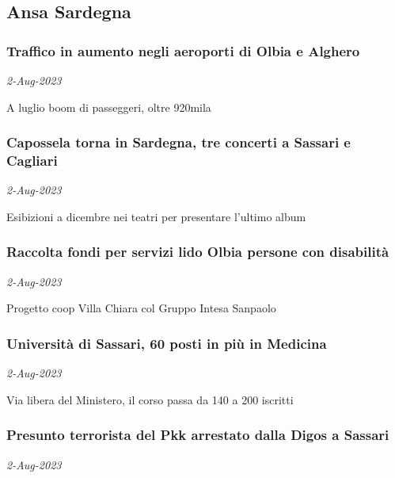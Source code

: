 \subsection{Ansa Sardegna \href{https://www.ansa.it/sardegna}{}}
\subsubsection{Traffico in aumento negli aeroporti di Olbia e Alghero \href{https://www.ansa.it/sardegna/notizie/2023/08/02/traffico-in-aumento-negli-aeroporti-di-olbia-e-alghero_aed7bae8-678e-4b3b-85d7-598a21b95419.html}{}}
\textit{2-Aug-2023}

A luglio boom di passeggeri, oltre 920mila
\subsubsection{Capossela torna in Sardegna, tre concerti a Sassari e Cagliari \href{https://www.ansa.it/sardegna/notizie/2023/08/02/capossela-torna-in-sardegna-tre-concerti-a-sassari-e-cagliari_9192115a-9063-4fb8-b7ef-a3efb7cfa1d4.html}{}}
\textit{2-Aug-2023}

Esibizioni a dicembre nei teatri per presentare l'ultimo album
\subsubsection{Raccolta fondi per servizi lido Olbia persone con disabilit\`{a} \href{https://www.ansa.it/sardegna/notizie/2023/08/02/raccolta-fondi-per-servizi-lido-olbia-persone-con-disabilita_8a909566-034e-42c6-ae78-3f3ad2ba5aba.html}{}}
\textit{2-Aug-2023}

Progetto coop Villa Chiara col Gruppo Intesa Sanpaolo
\subsubsection{Universit\`{a} di Sassari, 60 posti in pi\`{u} in Medicina \href{https://www.ansa.it/sardegna/notizie/2023/08/02/universita-di-sassari-60-posti-in-piu-in-medicina_89a88785-9de7-4cc8-b35d-5bff72091361.html}{}}
\textit{2-Aug-2023}

Via libera del Ministero, il corso passa da 140 a 200 iscritti
\subsubsection{Presunto terrorista del Pkk arrestato dalla Digos a Sassari \href{https://www.ansa.it/sardegna/notizie/2023/08/02/presunto-terrorista-del-pkk-arrestato-dalla-digos-a-sassari_cd96e48d-1d8b-4977-9987-d335a51d1921.html}{}}
\textit{2-Aug-2023}

